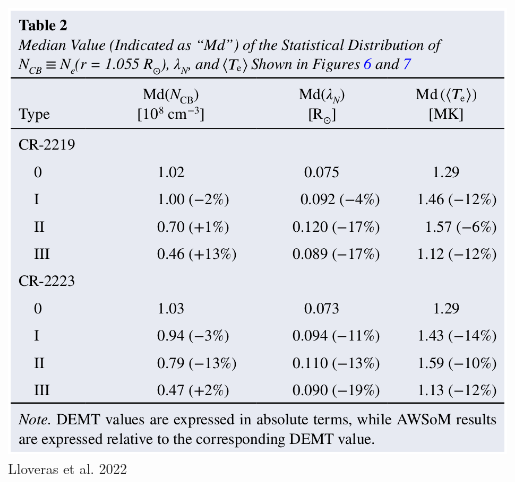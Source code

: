 \documentclass{beamer}
\begin{document}
{{\begin{columns}
\begin{center}
\includegraphics[width=0.99\textwidth]{figuras/table2_lloveras_2022.png}
Lloveras et al. 2022
\end{center}

\end{columns}

}
}


\end{document}
